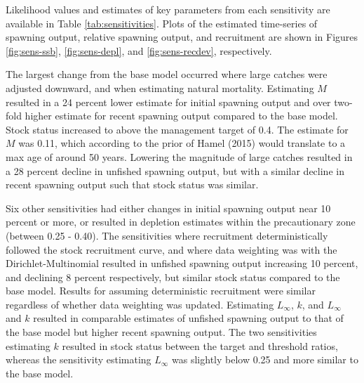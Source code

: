 \documentclass[11pt,
  english,
  letterpaper,
]{article}
\begin{document}
Likelihood values and estimates of key parameters from each sensitivity are available in Table \ref{tab:sensitivities}. Plots of the estimated time-series of spawning output, relative spawning output, and recruitment are shown in Figures \ref{fig:sens-ssb}, \ref{fig:sens-depl}, and \ref{fig:sens-recdev}, respectively.

\leavevmode\tagmcend\tagstructend\par


The largest change from the base model occurred where large catches were adjusted downward, and when estimating natural mortality. Estimating {\(M\)\leavevmode\tagmcend\tagstructend} resulted in a 24 percent lower estimate for initial spawning output and over two-fold higher estimate for recent spawning output compared to the base model. Stock status increased to above the management target of 0.4. The estimate for {\(M\)\leavevmode\tagmcend\tagstructend} was 0.11, which according to the prior of Hamel {(2015)\leavevmode\tagmcend\tagstructend} would translate to a max age of around 50 years. Lowering the magnitude of large catches resulted in a 28 percent decline in unfished spawning output, but with a similar decline in recent spawning output such that stock status was similar.

\leavevmode\tagmcend\tagstructend\par


Six other sensitivities had either changes in initial spawning output near 10 percent or more, or resulted in depletion estimates within the precautionary zone (between 0.25 - 0.40). The sensitivities where recruitment deterministically followed the stock recruitment curve, and where data weighting was with the Dirichlet-Multinomial resulted in unfished spawning output increasing 10 percent, and declining 8 percent respectively, but similar stock status compared to the base model. Results for assuming deterministic recruitment were similar regardless of whether data weighting was updated. Estimating {\(L_{\infty}\)\leavevmode\tagmcend\tagstructend}, {\(k\)\leavevmode\tagmcend\tagstructend}, and {\(L_{\infty}\)\leavevmode\tagmcend\tagstructend} and {\(k\)\leavevmode\tagmcend\tagstructend} resulted in comparable estimates of unfished spawning output to that of the base model but higher recent spawning output. The two sensitivities estimating {\(k\)\leavevmode\tagmcend\tagstructend} resulted in stock status between the target and threshold ratios, whereas the sensitivity estimating {\(L_{\infty}\)\leavevmode\tagmcend\tagstructend} was slightly below 0.25 and more similar to the base model.
\end{document}
